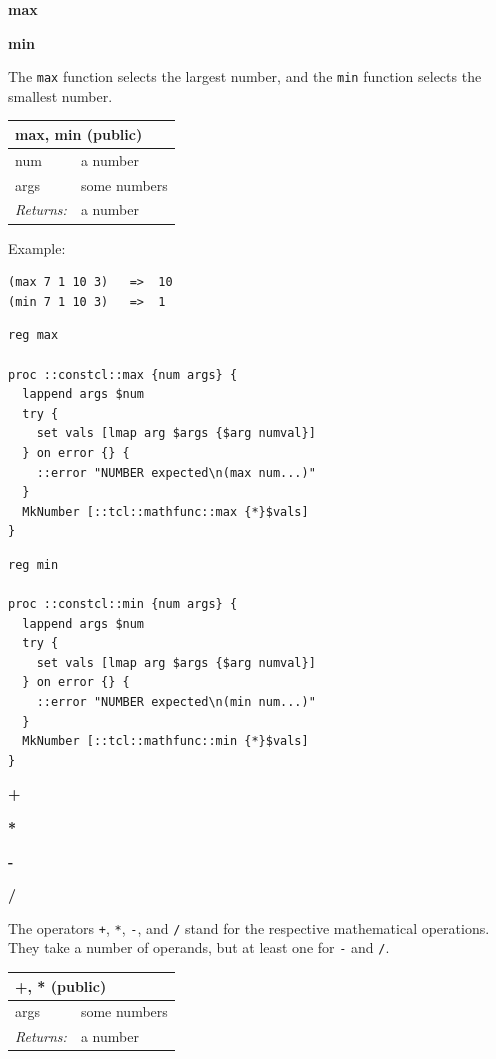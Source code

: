 \documentclass[twoside,9pt]{report}
\begin{document}
\textbf{max}


\textbf{min}


The \texttt{max} function selects the largest number, and the \texttt{min} function selects the smallest number.

\begin{tabular}{ |l l| }
\hline
\multicolumn{2}{|l|}{max, min (public)} \\
\hline
num & a number \\
args & some numbers \\
\textit{Returns:} & a number \\
\hline
\end{tabular}


Example:

\noindent\makebox[\linewidth]{\rule{\linewidth}{0.4pt}}
\begin{lstlisting}
(max 7 1 10 3)   =>  10
(min 7 1 10 3)   =>  1
\end{lstlisting}
\noindent\makebox[\linewidth]{\rule{\linewidth}{0.4pt}}
\noindent\makebox[\linewidth]{\rule{\linewidth}{0.4pt}}
\begin{lstlisting}
reg max
 
proc ::constcl::max {num args} {
  lappend args $num
  try {
    set vals [lmap arg $args {$arg numval}]
  } on error {} {
    ::error "NUMBER expected\n(max num...)"
  }
  MkNumber [::tcl::mathfunc::max {*}$vals]
}
\end{lstlisting}
\noindent\makebox[\linewidth]{\rule{\linewidth}{0.4pt}}
\noindent\makebox[\linewidth]{\rule{\linewidth}{0.4pt}}
\begin{lstlisting}
reg min
 
proc ::constcl::min {num args} {
  lappend args $num
  try {
    set vals [lmap arg $args {$arg numval}]
  } on error {} {
    ::error "NUMBER expected\n(min num...)"
  }
  MkNumber [::tcl::mathfunc::min {*}$vals]
}
\end{lstlisting}
\noindent\makebox[\linewidth]{\rule{\linewidth}{0.4pt}}

\textbf{+}


\textbf{*}


\textbf{-}


\textbf{/}


The operators \texttt{+}, \texttt{*}, \texttt{-}, and \texttt{/} stand for the respective mathematical operations. They take a number of operands, but at least one for \texttt{-} and \texttt{/}.

\begin{tabular}{ |l l| }
\hline
\multicolumn{2}{|l|}{+, * (public)} \\
\hline
args & some numbers \\
\textit{Returns:} & a number \\
\hline
\end{tabular}
\end{document}
